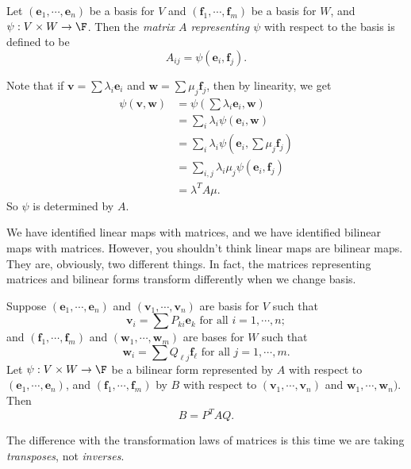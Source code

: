 \documentclass[a4paper]{article}
\begin{document}
\begin{defi}
  Let $(\mathbf{e}_1, \cdots, \mathbf{e}_n)$ be a basis for $V$ and $(\mathbf{f}_1, \cdots, \mathbf{f}_m)$ be a basis for $W$, and $\psi: V\times W \to \F$. Then the \emph{matrix $A$ representing $\psi$} with respect to the basis is defined to be
  \[
    A_{ij} = \psi(\mathbf{e}_i, \mathbf{f}_j).
  \]
\end{defi}
Note that if $\mathbf{v} = \sum \lambda_i \mathbf{e}_i$ and $\mathbf{w} = \sum \mu_j \mathbf{f}_j$, then by linearity, we get
\begin{align*}
  \psi(\mathbf{v}, \mathbf{w}) &= \psi\left(\sum \lambda_i \mathbf{e}_i, \mathbf{w}\right) \\
  &= \sum_i \lambda_i \psi(\mathbf{e}_i, \mathbf{w})\\
  &= \sum_i \lambda_i \psi\left(\mathbf{e}_i, \sum \mu_j \mathbf{f}_j\right)\\
  &= \sum_{i, j} \lambda_i \mu_j \psi(\mathbf{e}_i, \mathbf{f}_j)\\
  &= \lambda^T A \mu.
\end{align*}
So $\psi$ is determined by $A$.

We have identified linear maps with matrices, and we have identified bilinear maps with matrices. However, you shouldn't think linear maps are bilinear maps. They are, obviously, two different things. In fact, the matrices representing matrices and bilinear forms transform differently when we change basis.

\begin{prop}
  Suppose $(\mathbf{e}_1, \cdots, \mathbf{e}_n)$ and $(\mathbf{v}_1, \cdots, \mathbf{v}_n)$ are basis for $V$ such that
  \[
    \mathbf{v}_i = \sum P_{ki}\mathbf{e}_k\text{ for all }i = 1,\cdots, n;
  \]
  and $(\mathbf{f}_1, \cdots, \mathbf{f}_m)$ and $(\mathbf{w}_1, \cdots, \mathbf{w}_m)$ are bases for $W$ such that
  \[
    \mathbf{w}_i = \sum Q_{\ell j} \mathbf{f}_\ell\text{ for all }j = 1, \cdots, m.
  \]
  Let $\psi: V\times W \to \F$ be a bilinear form represented by $A$ with respect to $(\mathbf{e}_1, \cdots, \mathbf{e}_n)$, and $(\mathbf{f}_1, \cdots, \mathbf{f}_m)$ by $B$ with respect to $(\mathbf{v}_1, \cdots, \mathbf{v}_n)$ and $\mathbf{w}_1, \cdots, \mathbf{w}_n)$. Then
  \[
    B = P^T AQ.
  \]
\end{prop}
The difference with the transformation laws of matrices is this time we are taking \emph{transposes}, not \emph{inverses}.
\end{document}
